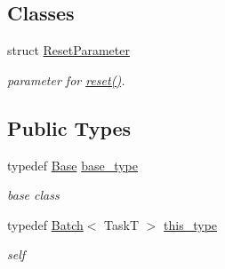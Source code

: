 \subsection*{Classes}
\begin{DoxyCompactItemize}
\item 
struct \hyperlink{structhryky_1_1task_1_1worker_1_1_batch_1_1_reset_parameter}{Reset\-Parameter}
\begin{DoxyCompactList}\small\item\em parameter for \hyperlink{group__task_ga88b1f6b27be23acb9fd42203d7cd3933}{reset()}. \end{DoxyCompactList}\end{DoxyCompactItemize}
\subsection*{Public Types}
\begin{DoxyCompactItemize}
\item 
\hypertarget{classhryky_1_1task_1_1worker_1_1_batch_a1cb435cd780b689c3cf049b0700b2e52}{typedef \hyperlink{classhryky_1_1task_1_1worker_1_1_base}{Base} \hyperlink{classhryky_1_1task_1_1worker_1_1_batch_a1cb435cd780b689c3cf049b0700b2e52}{base\-\_\-type}}\label{classhryky_1_1task_1_1worker_1_1_batch_a1cb435cd780b689c3cf049b0700b2e52}

\begin{DoxyCompactList}\small\item\em base class \end{DoxyCompactList}\item 
\hypertarget{classhryky_1_1task_1_1worker_1_1_batch_af2da1b6dcdcb3e24abf07af8c8a009e5}{typedef \hyperlink{classhryky_1_1task_1_1worker_1_1_batch}{Batch}$<$ Task\-T $>$ \hyperlink{classhryky_1_1task_1_1worker_1_1_batch_af2da1b6dcdcb3e24abf07af8c8a009e5}{this\-\_\-type}}\label{classhryky_1_1task_1_1worker_1_1_batch_af2da1b6dcdcb3e24abf07af8c8a009e5}

\begin{DoxyCompactList}\small\item\em self \end{DoxyCompactList}\end{DoxyCompactItemize}
